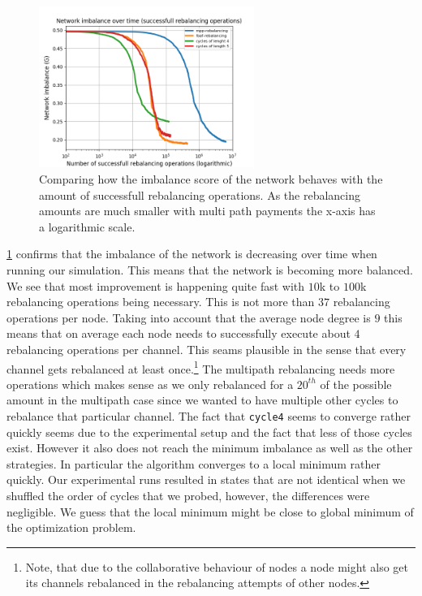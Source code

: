 \documentclass[a4paper]{paper}
\begin{document}
\begin{figure}
 \centering
 \includegraphics[width=7cm]{code/vs/fig/imba_vs_steps.png}
 \caption{Comparing how the imbalance score of the network behaves with the amount of successfull rebalancing operations. As the rebalancing amounts are much smaller with multi path payments the x-axis has a logarithmic scale.}
 \label{fig:imbalancehovertime}
\end{figure}

\cref{fig:imbalancehovertime} confirms that the imbalance of the network is decreasing over time when running our simulation.
This means that the network is becoming more balanced.
We see that most improvement is happening quite fast with $10$k to $100$k rebalancing operations being necessary.
This is not more than $37$ rebalancing operations per node.
Taking into account that the average node degree is $9$ this means that on average each node needs to successfully execute about $4$ rebalancing operations per channel.  
This seams plausible in the sense that every channel gets rebalanced at least once.\footnote{Note, that due to the collaborative behaviour of nodes a node might also get its channels rebalanced in the rebalancing attempts of other nodes.}
The multipath rebalancing needs more operations which makes sense as we only rebalanced for a $20^{th}$ of the possible amount in the multipath case since we wanted to have multiple other cycles to rebalance that particular channel.
The fact that \texttt{cycle4} seems to converge rather quickly seems due to the experimental setup and the fact that less of those cycles exist. However it also does not reach the minimum imbalance as well as the other strategies. 
In particular the algorithm converges to a local minimum rather quickly.
Our experimental runs resulted in states that are not identical when we shuffled the order of cycles that we probed, however, the differences were negligible. 
We guess that the local minimum might be close to global minimum of the optimization problem.
\end{document}
